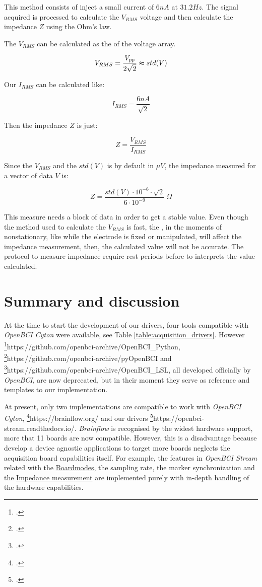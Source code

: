 This method consists of inject a small current of $6 nA$ at $31.2 Hz$. The signal acquired is processed to calculate the $V_{RMS}$ voltage and then calculate the impedance $Z$ using the Ohm’s law. 

The $V_{RMS}$ can be calculated as the  of the voltage array.

\[
V_{RMS}=\frac{V_{pp}}{2\sqrt{2}}\thickapprox std(V) 
\]

Our $I_{RMS}$ can be calculated like:

\[
I_{RMS}=\frac{6nA}{\sqrt{2}}
\]


Then the impedance $Z$ is just:

\[
Z=\frac{V_{RMS}}{I_{RMS}}
\]

Since the $V_{RMS}$ and the $std(V)$ is by default in $\mu V$, the impedance measured for a vector of data $V$ is:

\[
Z=\frac{std(V)\cdot10^{-6}\cdot\sqrt{2}}{6\cdot10^{-9}}\:\Omega
\]

This measure needs a block of data in order to get a stable value. Even though the method used to calculate the $V_{RMS}$ is fast, the , in the moments of nonstationary, like while the electrode is fixed or manipulated, will affect the impedance measurement, then, the calculated value will not be accurate. The protocol to measure impedance require rest periods before to interprets the value calculated.


\section{Summary and discussion}



At the time to start the development of our drivers, four tools compatible with \textit{OpenBCI Cyton} were available, see Table \ref{table:acquisition_drivers}. However \footcite{OpenBCI Python}{https://github.com/openbci-archive/OpenBCI\_Python}, \footcite{pyOpenBCI}{https://github.com/openbci-archive/pyOpenBCI} and \footcite{OpenBCI LSL}{https://github.com/openbci-archive/OpenBCI\_LSL}, all developed officially by \textit{OpenBCI}, are now deprecated, but in their moment they serve as reference and templates to our implementation. 

At present, only two implementations are compatible to work with \textit{OpenBCI Cyton}, \footcite{BrainFlow}{https://brainflow.org/} and our drivers \footcite{OpenBCI Stream}{https://openbci-stream.readthedocs.io/}. \textit{Brainflow} is recognised by the widest hardware support, more that 11 boards are now compatible. However, this is a disadvantage because develop a device agnostic applications to target more boards neglects the acquisition board capabilities itself. For example, the features in \textit{OpenBCI Stream} related with the \hyperref[subsec:boardmodes]{Boardmodes}, the sampling rate, the marker synchronization and the \hyperref[subsec:impedance-measurement]{Impedance measurement} are implemented purely with in-depth handling of the hardware capabilities.


